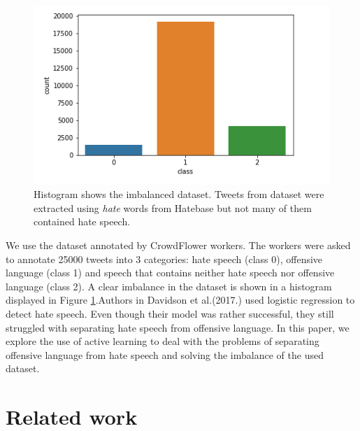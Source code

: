 \documentclass[10pt, a4paper]{article}
\begin{document}
\begin{figure}[h]
	\includegraphics[width=1.1\linewidth, height=0.25\textheight]{pictures/HistOfData}
	\caption[Histogram showing number of labeled classes]{Histogram shows the imbalanced dataset. Tweets from dataset were extracted using \textit{hate} words from Hatebase but not many of them contained hate speech.}
	\label{fig:histofdata}
\end{figure}

We use the dataset annotated by CrowdFlower workers. The workers were asked to annotate 25000 tweets into 3 categories: hate speech (class 0), offensive language (class 1) and speech that contains neither hate speech nor offensive language (class 2). A clear imbalance in the dataset is shown in a histogram displayed in Figure \ref{fig:histofdata}.Authors in Davidson et al.(2017.) used logistic regression to detect hate speech. Even though their model was rather successful, they still struggled with separating hate speech from offensive language. In this paper, we explore the use of active learning to deal with the problems of separating offensive language from hate speech and solving the imbalance of the used dataset.


\section{Related work}
\end{document}
